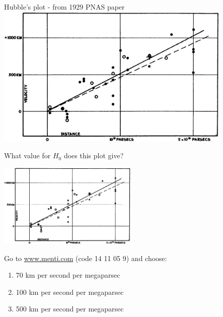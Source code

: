 \documentclass[usenames,dvipsnames,12pt,compress]{beamer}
\newcommand{\mentiurl}[0]{{\url{www.menti.com}}}
\newcommand{\menticode}[0]{{14 11 05 9}}
\newcommand{\mentiinvitation}[0]{Go to \mentiurl{} (code \menticode{}) and choose:\\}
\begin{document}
\begin{frame}{Hubble's plot - from 1929 PNAS paper}
\includegraphics[height=6.8cm]{F2.large.jpg}
\end{frame}


\begin{frame}{What value for $H_0$ does this plot give?}
  \begin{block}{}
  \includegraphics[height=4cm]{F2.large.jpg}
  \end{block}
  \begin{block}{}
    \mentiinvitation{}
    \begin{enumerate}
      \item{70 km per second per megaparsec}
      \item{100 km per second per megaparsec}
      \item{500 km per second per megaparsec}
    \end{enumerate}
  \end{block}
\end{frame}
\end{document}

